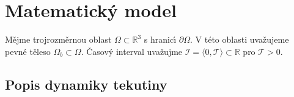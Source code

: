 
\chapter{Matematický model}
\label{chap:MatMod}

\pagestyle{plain}

    M\v{e}jme trojrozm\v{e}rnou oblast $\Omega \subset{\mathbb{R}^3}$ s hranic\'{\i} $\partial \Omega$. V t\'{e}to oblasti uva\v{z}ujeme pevn\'{e} t\v{e}leso $\Omega_b \subset{\Omega}$. \v{C}asov\'{y} interval uva\v{z}ujme $\mathcal{I} = \langle0,\mathcal{T} \rangle \subset{\mathbb{R}}$ pro $\mathcal{T}>0$.


    
    \section{Popis dynamiky tekutiny}
    \label{sec:DesFluDyn}
        
